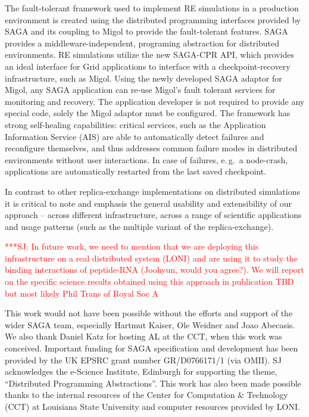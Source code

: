 \documentclass[times, 10pt, twocolumn]{article}
\newcommand{\jhanote}[1]{ {\textcolor{red} { ***SJ: #1 }}}
\newcommand{\jhanote}[1]{}
\begin{document}
The fault-tolerant framework used to implement RE simulations in a
production environment is created using the distributed programming
interfaces provided by SAGA and its coupling to Migol to provide the
fault-tolerant features.  SAGA provides a middleware-independent,
programing abstraction for distributed environments. RE simulations
utilize the new SAGA-CPR API, which provides an ideal interface for
Grid applications to interface with a checkpoint-recovery
infrastructure, such as Migol. Using the newly developed SAGA adaptor
for Migol, any SAGA application can re-use Migol's fault tolerant
services for monitoring and recovery.  The application developer is
not required to provide any special code, solely the Migol adaptor
must be configured.  The framework has strong self-healing
capabilities: critical services, such as the Application Information
Service (AIS) are able to automatically detect failures and
reconfigure themselves, and thus addresses common failure modes in
distributed environments without user interactions.
In case of failures, e.\,g.\ a node-crash, applications are
automatically restarted from the last saved
checkpoint. %

In contrast to other replica-exchange implementations on distributed
simulations it is critical to note and emphasis the general usability
and extensibility of our approach -- across different infrastructure,
across a range of scientific applications and usage patterns (such as
the multiple variant of the replica-exchange).

\jhanote{In future work, we need to mention that we are deploying this
  infrastructure on a real distributed system (LONI) and are using it
  to study the binding interactions of peptide-RNA (Joohyun, would you
  agree?). We will report on the specific science results obtained
  using this approach in publication TBD but most likely Phil Trans of
  Royal Soc A}

This work would not have been possible without the efforts and support
of the wider SAGA team, especially Hartmut Kaiser, Ole Weidner and
Joao Abecasis. We also thank Daniel Katz for hosting AL at the CCT,
when this work was conceived.  Important funding for SAGA
specification and development has been provided by the UK EPSRC grant
number GR/D0766171/1 (via OMII).  SJ acknowledges the e-Science
Institute, Edinburgh for supporting the theme, ``Distributed
Programming Abstractions''.  This work has also been made possible
thanks to the internal resources of the Center for Computation \&
Technology (CCT) at Louisiana State University and computer resources
provided by LONI.  

\end{document}
